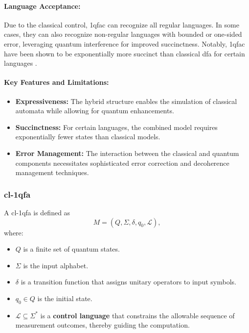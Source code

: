 \paragraph{Language Acceptance:}  
Due to the classical control, \gls{1qfac} can recognize all regular languages. In some cases, they can also recognize non-regular languages with bounded or one-sided error, leveraging quantum interference for improved succinctness. Notably, \gls{1qfac} have been shown to be exponentially more succinct than classical \gls{dfa} for certain languages \cite{bianchi2014size}.

\paragraph{Key Features and Limitations:}
\begin{itemize}
    \item \textbf{Expressiveness:} The hybrid structure enables the simulation of classical automata while allowing for quantum enhancements.
    \item \textbf{Succinctness:} For certain languages, the combined model requires exponentially fewer states than classical models.
    \item \textbf{Error Management:} The interaction between the classical and quantum components necessitates sophisticated error correction and decoherence management techniques.
\end{itemize}

\subsubsection{\gls{cl-1qfa}}
\label{sssec:cl-1qfa}
\begin{definition}
A \gls{cl-1qfa} is defined as 
\[
M = (Q, \Sigma, \delta, q_0, \mathcal{L}),
\]
where:
\begin{itemize}
    \item \( Q \) is a finite set of quantum states.
    \item \( \Sigma \) is the input alphabet.
    \item \(\delta\) is a transition function that assigns unitary operators to input symbols.
    \item \( q_0 \in Q \) is the initial state.
    \item \( \mathcal{L} \subseteq \Sigma^* \) is a \textbf{control language} that constrains the allowable sequence of measurement outcomes, thereby guiding the computation.
\end{itemize}
\end{definition}


